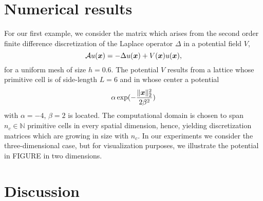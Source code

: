 \documentclass[12pt]{article}
\begin{document}
\section{Numerical results}
\label{sec:results}

For our first example, we consider the matrix which arises from the second order
finite difference discretization of the Laplace operator $\Delta$ in a potential
field $V$,
\begin{equation}
    \mathcal{A} u(\boldsymbol{x}) = - \Delta u(\boldsymbol{x}) + V(\boldsymbol{x}) u(\boldsymbol{x}),
    \label{equ:5-experiments-electronic-hamiltonian}
\end{equation}
for a uniform mesh of size $h=0.6$. The potential $V$ results from a
lattice whose primitive cell is of side-length $L=6$ and in whose center a
potential
\begin{equation}
    \alpha \exp(-\frac{\lVert \boldsymbol{x} \rVert _2^2}{ 2 \beta^2 })
    \label{equ:5-experiments-gaussian-cell}
\end{equation}
with $\alpha = -4$, $\beta = 2$ is located. The computational domain is chosen
to span $n_c \in \mathbb{N}$ primitive cells in every spatial dimension, hence, yielding
discretization matrices which are growing in size with $n_c$. In our experiments
we consider the three-dimensional case, but for visualization purposes, we
illustrate the potential in FIGURE
in two dimensions.




\section{Discussion}
\label{sec:discussion}
\end{document}
